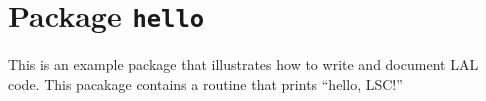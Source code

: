 \chapter{Package \texttt{hello}}

This is an example package that illustrates how to write and document LAL
code.  This pacakage contains a routine that prints ``hello, LSC!''

\newpage

